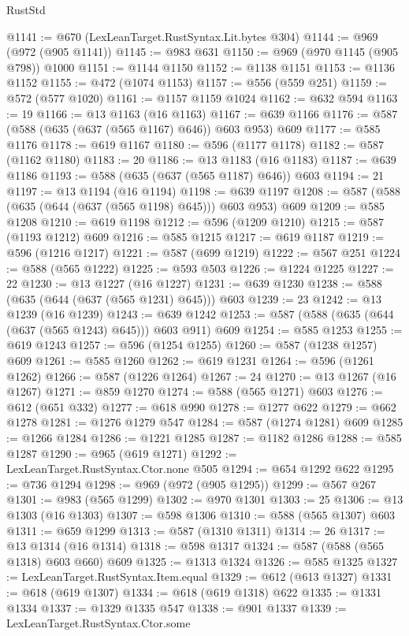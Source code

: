 \begin{lexlean}{RustStd}
\begin{coremodule}
@1141 := @670 (LexLeanTarget.RustSyntax.Lit.bytes @304)
@1144 := @969 (@972 (@905 @1141))
@1145 := @983 @631
@1150 := @969 (@970 @1145 (@905 @798)) @1000
@1151 := @1144 @1150
@1152 := @1138 @1151
@1153 := @1136 @1152
@1155 := @472 (@1074 @1153)
@1157 := @556 (@559 @251)
@1159 := @572 (@577 @1020)
@1161 := @1157 @1159 @1024
@1162 := @632 @594
@1163 := 19
@1166 := @13 @1163 (@16 @1163)
@1167 := @639 @1166
@1176 := @587 (@588 (@635 (@637 (@565 @1167) @646)) @603 @953) @609
@1177 := @585 @1176
@1178 := @619 @1167
@1180 := @596 (@1177 @1178)
@1182 := @587 (@1162 @1180)
@1183 := 20
@1186 := @13 @1183 (@16 @1183)
@1187 := @639 @1186
@1193 := @588 (@635 (@637 (@565 @1187) @646)) @603
@1194 := 21
@1197 := @13 @1194 (@16 @1194)
@1198 := @639 @1197
@1208 := @587 (@588 (@635 (@644 (@637 (@565 @1198) @645))) @603 @953) @609
@1209 := @585 @1208
@1210 := @619 @1198
@1212 := @596 (@1209 @1210)
@1215 := @587 (@1193 @1212) @609
@1216 := @585 @1215
@1217 := @619 @1187
@1219 := @596 (@1216 @1217)
@1221 := @587 (@699 @1219)
@1222 := @567 @251
@1224 := @588 (@565 @1222)
@1225 := @593 @503
@1226 := @1224 @1225
@1227 := 22
@1230 := @13 @1227 (@16 @1227)
@1231 := @639 @1230
@1238 := @588 (@635 (@644 (@637 (@565 @1231) @645))) @603
@1239 := 23
@1242 := @13 @1239 (@16 @1239)
@1243 := @639 @1242
@1253 := @587 (@588 (@635 (@644 (@637 (@565 @1243) @645))) @603 @911) @609
@1254 := @585 @1253
@1255 := @619 @1243
@1257 := @596 (@1254 @1255)
@1260 := @587 (@1238 @1257) @609
@1261 := @585 @1260
@1262 := @619 @1231
@1264 := @596 (@1261 @1262)
@1266 := @587 (@1226 @1264)
@1267 := 24
@1270 := @13 @1267 (@16 @1267)
@1271 := @859 @1270
@1274 := @588 (@565 @1271) @603
@1276 := @612 (@651 @332)
@1277 := @618 @990
@1278 := @1277 @622
@1279 := @662 @1278
@1281 := @1276 @1279 @547
@1284 := @587 (@1274 @1281) @609
@1285 := @1266 @1284
@1286 := @1221 @1285
@1287 := @1182 @1286
@1288 := @585 @1287
@1290 := @965 (@619 @1271)
@1292 := LexLeanTarget.RustSyntax.Ctor.none @505
@1294 := @654 @1292 @622
@1295 := @736 @1294
@1298 := @969 (@972 (@905 @1295))
@1299 := @567 @267
@1301 := @983 (@565 @1299)
@1302 := @970 @1301
@1303 := 25
@1306 := @13 @1303 (@16 @1303)
@1307 := @598 @1306
@1310 := @588 (@565 @1307) @603
@1311 := @659 @1299
@1313 := @587 (@1310 @1311)
@1314 := 26
@1317 := @13 @1314 (@16 @1314)
@1318 := @598 @1317
@1324 := @587 (@588 (@565 @1318) @603 @660) @609
@1325 := @1313 @1324
@1326 := @585 @1325
@1327 := LexLeanTarget.RustSyntax.Item.equal
@1329 := @612 (@613 @1327)
@1331 := @618 (@619 @1307)
@1334 := @618 (@619 @1318) @622
@1335 := @1331 @1334
@1337 := @1329 @1335 @547
@1338 := @901 @1337
@1339 := LexLeanTarget.RustSyntax.Ctor.some

\end{coremodule}
\end{lexlean}
